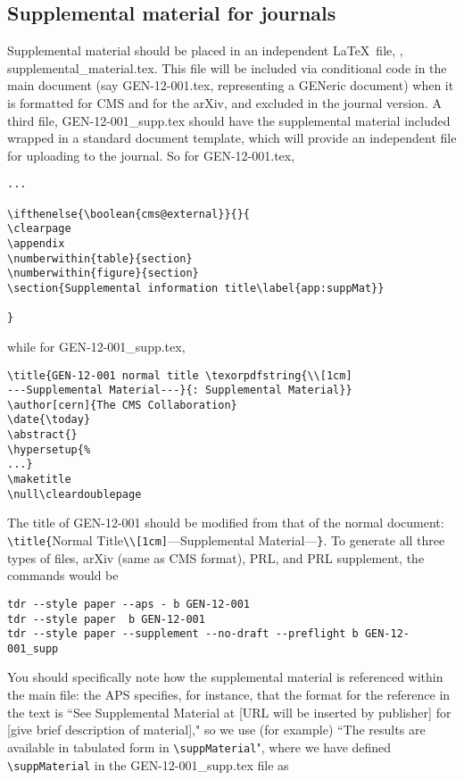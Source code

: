 \subsection{Supplemental material for journals\label{sec:journal-supplements}}
Supplemental material should be placed in an independent \LaTeX\ file, \eg, supplemental\_material.tex. This file will be included via conditional code in the main document (say GEN-12-001.tex, representing a GENeric document) when it is formatted for CMS and for the arXiv, and excluded in the journal version. A third file, GEN-12-001\_supp.tex should have the supplemental material included wrapped in a standard document template, which will provide an independent file for uploading to the journal.
So for GEN-12-001.tex,
\begin{verbatim}
...

\ifthenelse{\boolean{cms@external}}{}{
\clearpage
\appendix
\numberwithin{table}{section} 
\numberwithin{figure}{section}
\section{Supplemental information title\label{app:suppMat}}

}
\end{verbatim}
while for GEN-12-001\_supp.tex,
\begin{verbatim}
\title{GEN-12-001 normal title \texorpdfstring{\\[1cm]
---Supplemental Material---}{: Supplemental Material}}
\author[cern]{The CMS Collaboration}
\date{\today}
\abstract{}
\hypersetup{%
...}
\maketitle
\null\cleardoublepage

\end{verbatim}
The title of GEN-12-001 should be modified from that of the normal document: \verb|\title{|Normal Title\verb|\\[1cm]|---Supplemental Material---\verb|}|.
To generate all three types of files, arXiv (same as CMS format), PRL, and PRL supplement, the commands would be
\begin{verbatim}
tdr --style paper --aps - b GEN-12-001
tdr --style paper  b GEN-12-001
tdr --style paper --supplement --no-draft --preflight b GEN-12-001_supp
\end{verbatim}
You should specifically note how the supplemental material is referenced within the main file: the APS specifies, for instance, that the format for the reference in the text is ``See Supplemental Material at [URL will be inserted by publisher] for [give brief description of material]," so we use (for example) ``The results are available in tabulated form in \verb|\suppMaterial|", where we have defined \verb|\suppMaterial| in the GEN-12-001\_supp.tex file as

